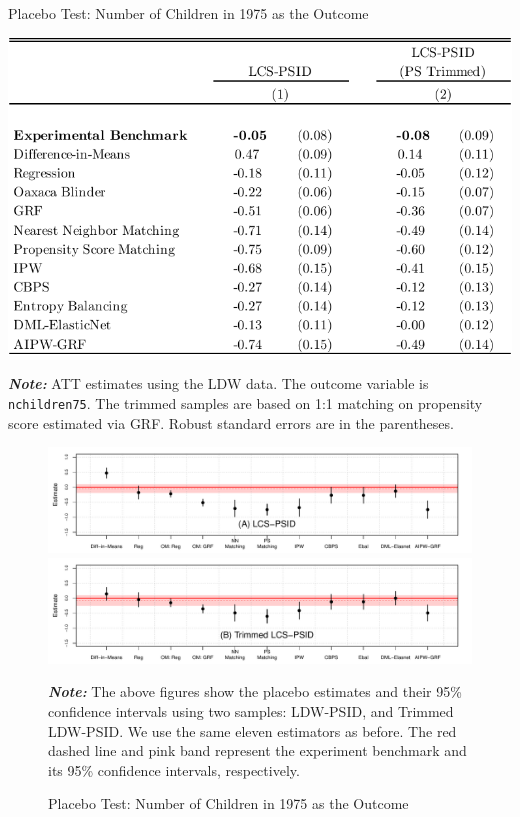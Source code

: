 \documentclass[letterpaper,12pt,leqno]{article}
\begin{document}
\begin{table}[!ht]
\caption{Placebo Test: Number of Children in 1975 as the Outcome}\label{tb:lcs.placebo}
\begin{minipage}[c]{1\textwidth}
\begin{center}
\vspace{-0.5em}\includegraphics[width=0.6\linewidth]{lcs_pl.pdf}
\end{center}\vspace{-1em}
{\footnotesize\textbf{\textit{Note:}} ATT estimates using the LDW data. The outcome variable is \texttt{nchildren75}. The trimmed samples are based on 1:1 matching on propensity score estimated via GRF. Robust standard errors are in the parentheses.}
\end{minipage}%
\end{table}
\bigskip

\begin{figure}[!ht]
    \caption{Placebo Test: Number of Children in 1975 as the Outcome}\label{fig:lcs.placebo}
    \vspace{-1em}
    \begin{minipage}[c]{1\textwidth}
    \begin{center}
    \includegraphics[width=0.7\linewidth]{coef_lcs_pl_psid.pdf}
    \includegraphics[width=0.7\linewidth]{coef_lcs_pl_psid_trim.pdf}
    \end{center}    \vspace{-1em}
     {\footnotesize\textbf{\textit{Note:}} The above figures show the placebo estimates and their 95\% confidence intervals using two samples: LDW-PSID, and Trimmed LDW-PSID. We use the same eleven estimators as before. The red dashed line and pink band represent the experiment benchmark and its 95\% confidence intervals, respectively.}
     \end{minipage}
\end{figure}
\end{document}
